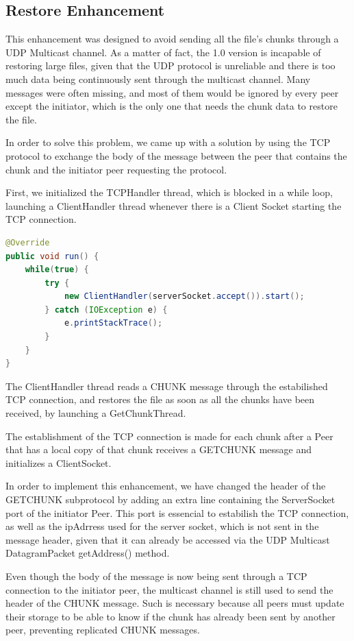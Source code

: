 \documentclass[11pt]{article}
\begin{document}
\pagebreak

\subsection{Restore Enhancement}

This enhancement was designed to avoid sending all the file's chunks through a UDP Multicast channel. As a matter of fact, the 1.0 version is incapable of restoring large files,
given that the UDP protocol is unreliable and there is too much data being continuously sent through the multicast channel. Many messages were often missing, and most of them would be ignored by every peer except the initiator,
which is the only one that needs the chunk data to restore the file.

In order to solve this problem, we came up with a solution by using the TCP protocol to exchange the body of the message between the peer that contains the chunk and the initiator peer requesting the protocol.

First, we initialized the TCPHandler thread, which is blocked in a while loop, launching a ClientHandler thread whenever there is a Client Socket starting the TCP connection.

\begin{lstlisting}[language=java]
@Override
public void run() {
	while(true) {
		try {
			new ClientHandler(serverSocket.accept()).start();
		} catch (IOException e) {
			e.printStackTrace();
		}
	}
}
\end{lstlisting}

The ClientHandler thread reads a CHUNK message through the estabilished TCP connection, and restores the file as soon as all the chunks have been received, by launching a GetChunkThread.

The establishment of the TCP connection is made for each chunk after a Peer that has a local copy of that chunk receives a GETCHUNK message and initializes a ClientSocket.

In order to implement this enhancement, we have changed the header of the GETCHUNK subprotocol by adding an extra line containing the ServerSocket port of the initiator Peer.
This port is essencial to estabilish the TCP connection, as well as the ipAdrress used for the server socket, which is not sent in the message header, given that it can already be accessed
via the UDP Multicast DatagramPacket getAddress() method.

Even though the body of the message is now being sent through a TCP connection to the initiator peer, the multicast channel is still used to send the header of the 
CHUNK message. Such is necessary because all peers must update their storage to be able to know if the chunk has already been sent by another peer, preventing replicated CHUNK messages.
\end{document}
